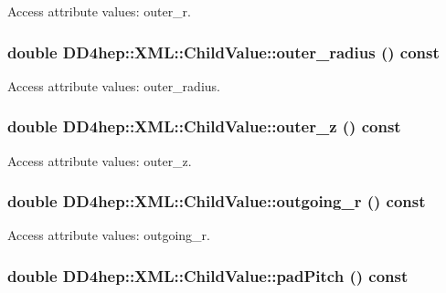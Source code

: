 Access attribute values: outer\_\-r. \hypertarget{struct_d_d4hep_1_1_x_m_l_1_1_child_value_a02b273a6addeb10cae0bf889d8c9dd7a}{
\subsubsection[{outer\_\-radius}]{\setlength{\rightskip}{0pt plus 5cm}double DD4hep::XML::ChildValue::outer\_\-radius () const}}
\label{struct_d_d4hep_1_1_x_m_l_1_1_child_value_a02b273a6addeb10cae0bf889d8c9dd7a}


Access attribute values: outer\_\-radius. \hypertarget{struct_d_d4hep_1_1_x_m_l_1_1_child_value_a14c4879c57f70257d777b1bf82538931}{
\subsubsection[{outer\_\-z}]{\setlength{\rightskip}{0pt plus 5cm}double DD4hep::XML::ChildValue::outer\_\-z () const}}
\label{struct_d_d4hep_1_1_x_m_l_1_1_child_value_a14c4879c57f70257d777b1bf82538931}


Access attribute values: outer\_\-z. \hypertarget{struct_d_d4hep_1_1_x_m_l_1_1_child_value_add9e6744daaa29638c5f6404fae3b5e1}{
\subsubsection[{outgoing\_\-r}]{\setlength{\rightskip}{0pt plus 5cm}double DD4hep::XML::ChildValue::outgoing\_\-r () const}}
\label{struct_d_d4hep_1_1_x_m_l_1_1_child_value_add9e6744daaa29638c5f6404fae3b5e1}


Access attribute values: outgoing\_\-r. \hypertarget{struct_d_d4hep_1_1_x_m_l_1_1_child_value_a4df110a147f8ff76d832ff631db83c98}{
\subsubsection[{padPitch}]{\setlength{\rightskip}{0pt plus 5cm}double DD4hep::XML::ChildValue::padPitch () const}}
\label{struct_d_d4hep_1_1_x_m_l_1_1_child_value_a4df110a147f8ff76d832ff631db83c98}


